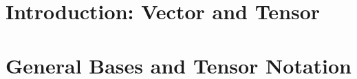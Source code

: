 \documentclass[11pt]{report}
\begin{document}
\tableofcontents



\chapter{Introduction: Vector and Tensor}


\chapter{General Bases and Tensor Notation}

\end{document}

